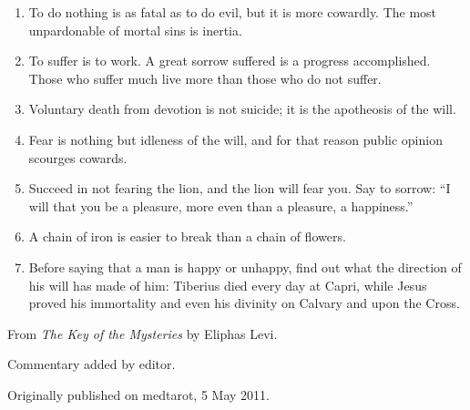 \begin{enumerate}[label=\Roman*.]
\item To do nothing is as fatal as to do evil, but it is more cowardly. The most unpardonable of mortal sins is inertia.

\item To suffer is to work. A great sorrow suffered is a progress accomplished. Those who suffer much live more than those who do not suffer.

\item Voluntary death from devotion is not suicide; it is the apotheosis of the will.

\item Fear is nothing but idleness of the will, and for that reason public opinion scourges cowards.

\item Succeed in not fearing the lion, and the lion will fear you. Say to sorrow: ``I will that you be a pleasure, more even than a pleasure, a happiness.''

\item A chain of iron is easier to break than a chain of flowers.

\item Before saying that a man is happy or unhappy, find out what the direction of his will has made of him: Tiberius died every day at Capri, while Jesus proved his immortality and even his divinity on Calvary and upon the Cross.
\end{enumerate}

From \textit{The Key of the Mysteries} by Eliphas Levi.

Commentary added by editor.

Originally published on medtarot, 5 May 2011.



